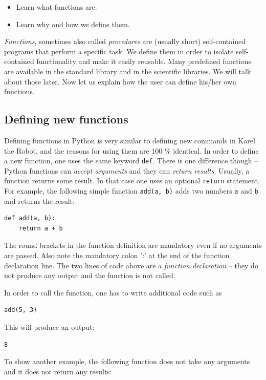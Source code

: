 \documentclass[article,A4,12pt]{llncs}
\begin{document}
\begin{itemize}
\item Learn what functions are.
\item Learn why and how we define them.
\end{itemize}
{\em Functions}, sometimes also called {\em procedures} are (usually short) self-contained programs that perform a specific task. 
We define them in order to isolate self-contained functionality and make it easily reusable.
Many predefined functions are available in the standard library and in the scientific libraries. 
We will talk about those later. Now let us explain how the user can define his/her own functions.

\subsection{Defining new functions}

Defining functions in Python is very similar to defining new commands 
in Karel the Robot, and the reasons for using them are 100 \% identical.
In order to define a new function, one uses the same keyword {\tt def}.
There is one difference though -- Python functions can {\em accept arguments} and 
they can {\em return results}. Usually, a function returns 
some result. In that case one uses an optional {\tt return} statement. For example, 
the following simple function {\tt add(a, b)} adds two numbers {\tt a} and {\tt b} 
and returns the result:

\begin{verbatim}
def add(a, b):
    return a + b
\end{verbatim}
The round brackets in the function definition are mandatory even if no arguments are passed.
Also note the mandatory colon ':' at the end of the function declaration line. The two lines of code above 
are a {\em function declaration} -- they do not produce any output and the function is not called. 

In order to call the function, one has to write additional code such as

\begin{verbatim}
add(5, 3)
\end{verbatim}
This will produce an output:

\begin{verbatim}
8
\end{verbatim}
To show another example, the following function does not take any arguments 
and it does not return any results:
\end{document}
